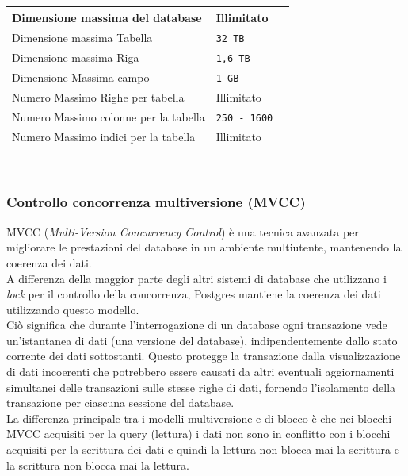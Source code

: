 \begin{tabular}{|l|l|r|}
\hline
Dimensione massima del database & Illimitato\\
\hline
Dimensione massima Tabella & \verb"32 TB"\\
\hline
Dimensione massima Riga & \verb"1,6 TB"\\
\hline
Dimensione Massima campo & \verb"1 GB"\\
\hline
Numero Massimo Righe per tabella & Illimitato\\
\hline
Numero Massimo colonne per la tabella & \verb"250 - 1600"\\
\hline
Numero Massimo indici per la tabella & Illimitato\cite{etichetta12}\\
\hline
\end{tabular}\\

\subsubsection{Controllo concorrenza multiversione (MVCC)}
MVCC (\textit{Multi-Version Concurrency Control}) \`{e} una tecnica avanzata per migliorare le prestazioni del database in un ambiente multiutente, mantenendo la coerenza dei dati. \\
A differenza della maggior parte degli altri sistemi di database che utilizzano i \textit{lock} per il controllo della concorrenza, Postgres mantiene la coerenza dei dati utilizzando questo modello. \\
Ci\`{o} significa che durante l'interrogazione di un database ogni transazione vede un'istantanea di dati (una versione del database), indipendentemente dallo stato corrente dei dati sottostanti. Questo protegge la transazione dalla visualizzazione di dati incoerenti che potrebbero essere causati da altri eventuali aggiornamenti simultanei delle transazioni sulle stesse righe di dati, fornendo l'isolamento della transazione per ciascuna sessione del database\cite{etichetta15}.\\

La differenza principale tra i modelli multiversione e di blocco \`{e} che nei blocchi MVCC acquisiti per la query (lettura) i dati non sono in conflitto con i blocchi acquisiti per la scrittura dei dati e quindi la lettura non blocca mai la scrittura e la scrittura non blocca mai la lettura.

